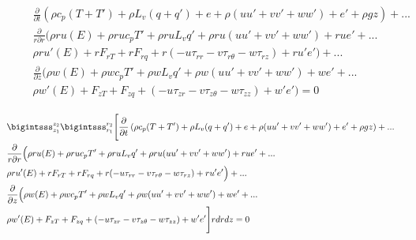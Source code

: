 \documentclass[10pt,a4paper]{article}
\begin{document}
\begin{align}
&\begin{split}
&\frac{\partial}{\partial t} \left(\rho c_p(T+T')+\rho L_v(q+q')+e+\rho(uu'+vv'+ww')+e'+\rho gz\right)+...\\
&\frac{\partial }{r\partial r}\Big(\rho r u(E)+\rho r uc_pT'+\rho r uL_vq'+\rho r u(uu'+vv'+ww')+ r u e'+...\\
&\rho r u'(E)+rF_{rT}+ rF_{rq}+ r(-u\tau_{rr} -v\tau_{r \theta}-w\tau_{r z})+r u'e'\Big)+...\\
&\frac{\partial}{\partial z}\Big(\rho  w(E)+\rho  wc_pT'+\rho  wL_vq'+\rho  w(uu'+vv'+ww')+  w e'+...\\
&\rho  w'(E)+F_{zT}+ F_{zq}+ (-u\tau_{zr} -v\tau_{z \theta}-w\tau_{z z})+ w'e'\Big) = 0
\end{split}
\end{align}


\begin{align}
&\begin{split}
&\bigintsss_{z_1}^{z_2} \bigintsss_{r_1}^{r_2}\Bigg[\frac{\partial}{\partial t} \left(\rho c_p(T+T')+\rho L_v(q+q')+e+\rho(uu'+vv'+ww')+e'+\rho gz\right)+...\\
&\frac{\partial }{r\partial r}\Big(\rho r u(E)+\rho r uc_pT'+\rho r uL_vq'+\rho r u(uu'+vv'+ww')+ r u e'+...\\
&\rho r u'(E)+rF_{rT}+ rF_{rq}+ r(-u\tau_{rr} -v\tau_{r \theta}-w\tau_{r z})+r u'e'\Big)+...\\
&\frac{\partial}{\partial z}\Big(\rho  w(E)+\rho  wc_pT'+\rho  wL_vq'+\rho  w(uu'+vv'+ww')+  w e'+...\\
&\rho  w'(E)+F_{zT}+ F_{zq}+ (-u\tau_{zr} -v\tau_{z \theta}-w\tau_{z z})+  w'e'\Bigg] r dr dz= 0
\end{split}
\end{align}
\end{document}

